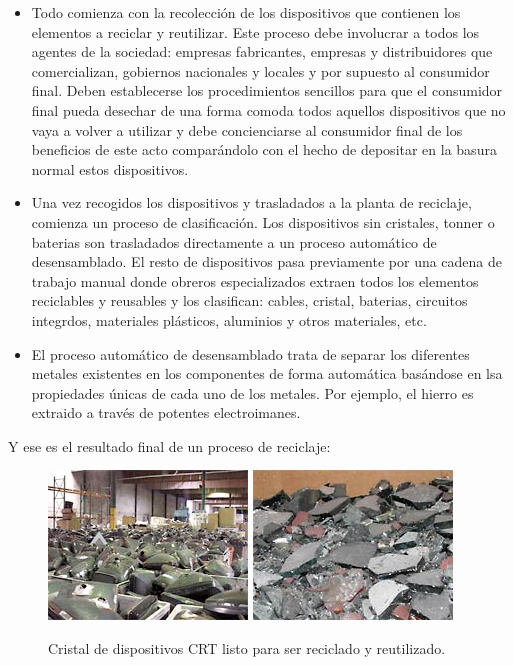 \begin{itemize}

\item{Todo comienza con la recolección de los dispositivos que contienen los elementos a reciclar y reutilizar. Este proceso debe involucrar a todos los agentes de la sociedad: empresas fabricantes, empresas y distribuidores que comercializan, gobiernos nacionales y locales y por supuesto al consumidor final. Deben establecerse los procedimientos sencillos para que el consumidor final pueda desechar de una forma comoda todos aquellos dispositivos que no vaya a volver a utilizar y debe concienciarse al consumidor final de los beneficios de este acto comparándolo con el hecho de depositar en la basura normal estos dispositivos.}

\item{Una vez recogidos los dispositivos y trasladados a la planta de reciclaje, comienza un proceso de clasificación. Los dispositivos sin cristales, tonner o baterias son trasladados directamente a un proceso automático de desensamblado. El resto de dispositivos pasa previamente por una cadena de trabajo manual donde obreros especializados extraen todos los elementos reciclables y reusables y los clasifican: cables, cristal, baterias, circuitos integrdos, materiales plásticos, aluminios y otros materiales, etc.}

\item{El proceso automático de desensamblado trata de separar los diferentes metales existentes en los componentes de forma automática basándose en lsa propiedades únicas de cada uno de los metales. Por ejemplo, el hierro es extraido a través de potentes electroimanes.}

\end{itemize}

Y ese es el resultado final de un proceso de reciclaje:

\begin{figure}[H]
\begin{center}
\includegraphics[]{img/ewaste_2}
\includegraphics[]{img/ewaste_4}
\caption{Cristal de dispositivos CRT listo para ser reciclado y reutilizado.}
\end{center}
\end{figure}

